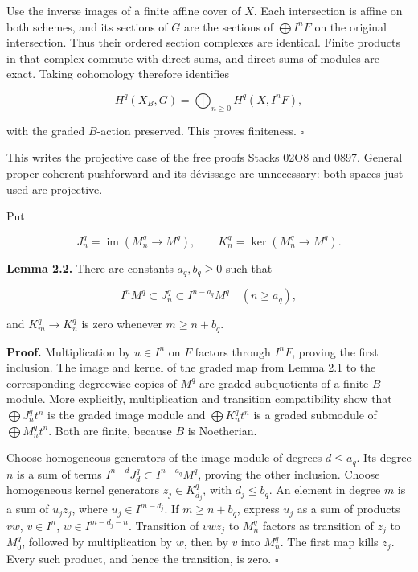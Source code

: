 \documentclass[11pt,a4paper,openany]{report}
\begin{document}
Use the inverse images of a finite affine cover of \(X\). Each intersection is affine on both schemes, and its sections of \(G\) are the sections of \(\bigoplus I^nF\) on the original intersection. Thus their ordered section complexes are identical. Finite products in that complex commute with direct sums, and direct sums of modules are exact. Taking cohomology therefore identifies

\[
H^q(X_B,G)=\bigoplus_{n\geq0}H^q(X,I^nF),
\]

with the graded \(B\)-action preserved. This proves finiteness. \(\square\)

This writes the projective case of the free proofs \href{https://stacks.math.columbia.edu/tag/02O8}{Stacks 02O8} and \href{https://stacks.math.columbia.edu/tag/0897}{0897}. General proper coherent pushforward and its dévissage are unnecessary: both spaces just used are projective.

Put

\[
J_n^q=\operatorname{im}(M_n^q\to M^q),\qquad
K_n^q=\ker(M_n^q\to M^q).
\]

\textbf{Lemma 2.2.} There are constants \(a_q,b_q\geq0\) such that

\[
I^nM^q\subset J_n^q\subset I^{n-a_q}M^q\quad(n\geq a_q),
\]

and \(K_m^q\to K_n^q\) is zero whenever \(m\geq n+b_q\).

\textbf{Proof.} Multiplication by \(u\in I^n\) on \(F\) factors through \(I^nF\), proving the first inclusion. The image and kernel of the graded map from Lemma 2.1 to the corresponding degreewise copies of \(M^q\) are graded subquotients of a finite \(B\)-module. More explicitly, multiplication and transition compatibility show that \(\bigoplus J_n^qt^n\) is the graded image module and \(\bigoplus K_n^qt^n\) is a graded submodule of \(\bigoplus M_n^qt^n\). Both are finite, because \(B\) is Noetherian.

Choose homogeneous generators of the image module of degrees \(d\leq a_q\). Its degree \(n\) is a sum of terms \(I^{n-d}J_d^q\subset I^{n-a_q}M^q\), proving the other inclusion. Choose homogeneous kernel generators \(z_j\in K_{d_j}^q\), with \(d_j\leq b_q\). An element in degree \(m\) is a sum of \(u_jz_j\), where \(u_j\in I^{m-d_j}\). If \(m\geq n+b_q\), express \(u_j\) as a sum of products \(vw\), \(v\in I^n\), \(w\in I^{m-d_j-n}\). Transition of \(vwz_j\) to \(M_n^q\) factors as transition of \(z_j\) to \(M_0^q\), followed by multiplication by \(w\), then by \(v\) into \(M_n^q\). The first map kills \(z_j\). Every such product, and hence the transition, is zero. \(\square\)
\end{document}
